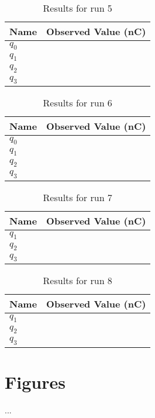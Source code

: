 \begin{table}[ht]
	\centering
	\begin{tabular}{|l|r|}
		\hline
		Name & Observed Value (nC) \\
		\hline
		$q_{0}$ & \\
		$q_{1}$ & \\
		$q_{2}$ & \\
		$q_{3}$ & \\
		\hline
	\end{tabular}
	\caption{Results for run 5}
	\label{table_01_run_5}
\end{table}
\begin{table}[ht]
	\centering
	\begin{tabular}{|l|r|}
		\hline
		Name & Observed Value (nC) \\
		\hline
		$q_{0}$ & \\
		$q_{1}$ & \\
		$q_{2}$ & \\
		$q_{3}$ & \\
		\hline
	\end{tabular}
	\caption{Results for run 6}
	\label{table_01_run_6}
\end{table}
\begin{table}[ht]
	\centering
	\begin{tabular}{|l|r|}
		\hline
		Name & Observed Value (nC) \\
		\hline
		$q_{1}$ & \\
		$q_{2}$ & \\
		$q_{3}$ & \\
		\hline
	\end{tabular}
	\caption{Results for run 7}
	\label{table_01_run_7}
\end{table}
\begin{table}[ht]
	\centering
	\begin{tabular}{|l|r|}
		\hline
		Name & Observed Value (nC) \\
		\hline
		$q_{1}$ & \\
		$q_{2}$ & \\
		$q_{3}$ & \\
		\hline
	\end{tabular}
	\caption{Results for run 8}
	\label{table_01_run_8}
\end{table}
\newpage
\section{Figures}
...